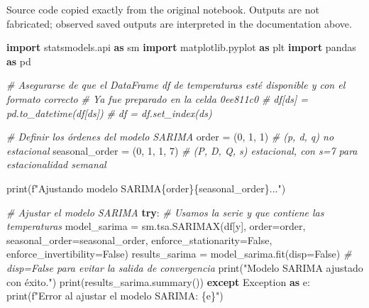 \documentclass[
  11pt,
]{article}
\newenvironment{Shaded}{}{}
\newcommand{\BuiltInTok}[1]{\textcolor[rgb]{0.00,0.50,0.00}{#1}}
\newcommand{\CommentTok}[1]{\textcolor[rgb]{0.38,0.63,0.69}{\textit{#1}}}
\newcommand{\ControlFlowTok}[1]{\textcolor[rgb]{0.00,0.44,0.13}{\textbf{#1}}}
\newcommand{\DecValTok}[1]{\textcolor[rgb]{0.25,0.63,0.44}{#1}}
\newcommand{\ImportTok}[1]{\textcolor[rgb]{0.00,0.50,0.00}{\textbf{#1}}}
\newcommand{\NormalTok}[1]{#1}
\newcommand{\OperatorTok}[1]{\textcolor[rgb]{0.40,0.40,0.40}{#1}}
\newcommand{\PreprocessorTok}[1]{\textcolor[rgb]{0.74,0.48,0.00}{#1}}
\newcommand{\SpecialCharTok}[1]{\textcolor[rgb]{0.25,0.44,0.63}{#1}}
\newcommand{\SpecialStringTok}[1]{\textcolor[rgb]{0.73,0.40,0.53}{#1}}
\newcommand{\StringTok}[1]{\textcolor[rgb]{0.25,0.44,0.63}{#1}}
\newcommand{\VariableTok}[1]{\textcolor[rgb]{0.10,0.09,0.49}{#1}}
\begin{document}
Source code copied exactly from the original notebook. Outputs are not fabricated; observed saved outputs are interpreted in the documentation above.

\begin{Shaded}
\begin{Highlighting}[]
\ImportTok{import}\NormalTok{ statsmodels.api }\ImportTok{as}\NormalTok{ sm}
\ImportTok{import}\NormalTok{ matplotlib.pyplot }\ImportTok{as}\NormalTok{ plt}
\ImportTok{import}\NormalTok{ pandas }\ImportTok{as}\NormalTok{ pd}

\CommentTok{\# Asegurarse de que el DataFrame \textquotesingle{}df\textquotesingle{} de temperaturas esté disponible y con el formato correcto}
\CommentTok{\# Ya fue preparado en la celda 0ee811c0}
\CommentTok{\# df[\textquotesingle{}ds\textquotesingle{}] = pd.to\_datetime(df[\textquotesingle{}ds\textquotesingle{}])}
\CommentTok{\# df = df.set\_index(\textquotesingle{}ds\textquotesingle{})}

\CommentTok{\# Definir los órdenes del modelo SARIMA}
\NormalTok{order }\OperatorTok{=}\NormalTok{ (}\DecValTok{0}\NormalTok{, }\DecValTok{1}\NormalTok{, }\DecValTok{1}\NormalTok{)        }\CommentTok{\# (p, d, q) no estacional}
\NormalTok{seasonal\_order }\OperatorTok{=}\NormalTok{ (}\DecValTok{0}\NormalTok{, }\DecValTok{1}\NormalTok{, }\DecValTok{1}\NormalTok{, }\DecValTok{7}\NormalTok{) }\CommentTok{\# (P, D, Q, s) estacional, con s=7 para estacionalidad semanal}

\BuiltInTok{print}\NormalTok{(}\SpecialStringTok{f"Ajustando modelo SARIMA}\SpecialCharTok{\{}\NormalTok{order}\SpecialCharTok{\}\{}\NormalTok{seasonal\_order}\SpecialCharTok{\}}\SpecialStringTok{..."}\NormalTok{)}

\CommentTok{\# Ajustar el modelo SARIMA}
\ControlFlowTok{try}\NormalTok{:}
    \CommentTok{\# Usamos la serie \textquotesingle{}y\textquotesingle{} que contiene las temperaturas}
\NormalTok{    model\_sarima }\OperatorTok{=}\NormalTok{ sm.tsa.SARIMAX(df[}\StringTok{\textquotesingle{}y\textquotesingle{}}\NormalTok{], order}\OperatorTok{=}\NormalTok{order, seasonal\_order}\OperatorTok{=}\NormalTok{seasonal\_order, enforce\_stationarity}\OperatorTok{=}\VariableTok{False}\NormalTok{, enforce\_invertibility}\OperatorTok{=}\VariableTok{False}\NormalTok{)}
\NormalTok{    results\_sarima }\OperatorTok{=}\NormalTok{ model\_sarima.fit(disp}\OperatorTok{=}\VariableTok{False}\NormalTok{) }\CommentTok{\# disp=False para evitar la salida de convergencia}
    \BuiltInTok{print}\NormalTok{(}\StringTok{"Modelo SARIMA ajustado con éxito."}\NormalTok{)}
    \BuiltInTok{print}\NormalTok{(results\_sarima.summary())}
\ControlFlowTok{except} \PreprocessorTok{Exception} \ImportTok{as}\NormalTok{ e:}
    \BuiltInTok{print}\NormalTok{(}\SpecialStringTok{f"Error al ajustar el modelo SARIMA: }\SpecialCharTok{\{}\NormalTok{e}\SpecialCharTok{\}}\SpecialStringTok{"}\NormalTok{)}
\end{Highlighting}
\end{Shaded}
\end{document}
